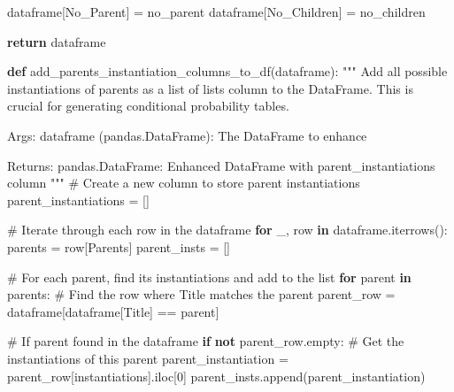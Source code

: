 \documentclass[
  11pt,
  letterpaper,
]{book}
\newenvironment{Shaded}{\begin{snugshade}}{\end{snugshade}}
\newcommand{\CommentTok}[1]{\textcolor[rgb]{0.37,0.37,0.37}{#1}}
\newcommand{\ControlFlowTok}[1]{\textcolor[rgb]{0.00,0.23,0.31}{\textbf{#1}}}
\newcommand{\DecValTok}[1]{\textcolor[rgb]{0.68,0.00,0.00}{#1}}
\newcommand{\KeywordTok}[1]{\textcolor[rgb]{0.00,0.23,0.31}{\textbf{#1}}}
\newcommand{\NormalTok}[1]{\textcolor[rgb]{0.00,0.23,0.31}{#1}}
\newcommand{\OperatorTok}[1]{\textcolor[rgb]{0.37,0.37,0.37}{#1}}
\newcommand{\StringTok}[1]{\textcolor[rgb]{0.13,0.47,0.30}{#1}}
\begin{document}
\begin{landscape}
\begin{Shaded}
\begin{Highlighting}[]
\NormalTok{    dataframe[}\StringTok{\textquotesingle{}No\_Parent\textquotesingle{}}\NormalTok{] }\OperatorTok{=}\NormalTok{ no\_parent}
\NormalTok{    dataframe[}\StringTok{\textquotesingle{}No\_Children\textquotesingle{}}\NormalTok{] }\OperatorTok{=}\NormalTok{ no\_children}

    \ControlFlowTok{return}\NormalTok{ dataframe}

\KeywordTok{def}\NormalTok{ add\_parents\_instantiation\_columns\_to\_df(dataframe):}
    \CommentTok{"""}
\CommentTok{    Add all possible instantiations of parents as a list of lists column}
\CommentTok{    to the DataFrame.}
\CommentTok{    This is crucial for generating conditional probability tables.}

\CommentTok{    Args:}
\CommentTok{        dataframe (pandas.DataFrame): The DataFrame to enhance}

\CommentTok{    Returns:}
\CommentTok{        pandas.DataFrame: Enhanced DataFrame with parent\_instantiations column}
\CommentTok{    """}
    \CommentTok{\# Create a new column to store parent instantiations}
\NormalTok{    parent\_instantiations }\OperatorTok{=}\NormalTok{ []}

    \CommentTok{\# Iterate through each row in the dataframe}
    \ControlFlowTok{for}\NormalTok{ \_, row }\KeywordTok{in}\NormalTok{ dataframe.iterrows():}
\NormalTok{        parents }\OperatorTok{=}\NormalTok{ row[}\StringTok{\textquotesingle{}Parents\textquotesingle{}}\NormalTok{]}
\NormalTok{        parent\_insts }\OperatorTok{=}\NormalTok{ []}

        \CommentTok{\# For each parent, find its instantiations and add to the list}
        \ControlFlowTok{for}\NormalTok{ parent }\KeywordTok{in}\NormalTok{ parents:}
            \CommentTok{\# Find the row where Title matches the parent}
\NormalTok{            parent\_row }\OperatorTok{=}\NormalTok{ dataframe[dataframe[}\StringTok{\textquotesingle{}Title\textquotesingle{}}\NormalTok{] }\OperatorTok{==}\NormalTok{ parent]}

            \CommentTok{\# If parent found in the dataframe}
            \ControlFlowTok{if} \KeywordTok{not}\NormalTok{ parent\_row.empty:}
                \CommentTok{\# Get the instantiations of this parent}
\NormalTok{                parent\_instantiation }\OperatorTok{=}\NormalTok{ parent\_row[}\StringTok{\textquotesingle{}instantiations\textquotesingle{}}\NormalTok{].iloc[}\DecValTok{0}\NormalTok{]}
\NormalTok{                parent\_insts.append(parent\_instantiation)}


\end{Highlighting}
\end{Shaded}
\end{landscape}
\end{document}

